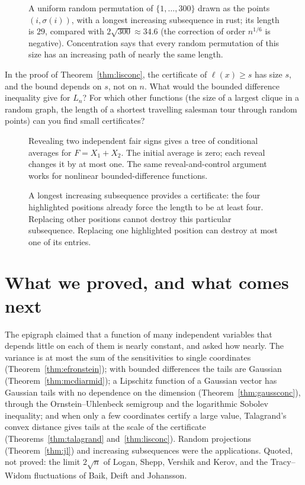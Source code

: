 \begin{figure}[ht]
\centering{}
\caption{A uniform random permutation of $\{1,\dots,300\}$ drawn as the points $(i,\sigma(i))$, with a longest increasing subsequence in rust; its length is $29$,
compared with $2\sqrt{300}\approx34.6$ (the correction of order $n^{1/6}$ is negative). Concentration says that every random permutation of this size has an
increasing path of nearly the same length.}
\label{fig:lis}
\end{figure}

\begin{think}
In the proof of Theorem~\ref{thm:lisconc}, the certificate of $\ell(x)\ge s$ has size $s$, and the bound depends on $s$, not on $n$. What would the bounded difference inequality
give for $L_n$? For which other functions (the size of a largest clique in a random graph, the length of a shortest travelling salesman tour through random points) can
you find small certificates?
\end{think}

\begin{figure}[ht]
\centering{}
\caption{Revealing two independent fair signs gives a tree of conditional averages for $F=X_1+X_2$. The initial average is zero; each reveal changes it by at most one. The same reveal-and-control argument works for nonlinear bounded-difference functions.}
\label{fig:v11-ch08-reveal-tree}
\end{figure}

\begin{figure}[ht]
\centering{}
\caption{A longest increasing subsequence provides a certificate: the four highlighted positions already force the length to be at least four. Replacing other positions cannot destroy this particular subsequence. Replacing one highlighted position can destroy at most one of its entries.}
\label{fig:v11-ch08-certificate}
\end{figure}

\section{What we proved, and what comes next}

The epigraph claimed that a function of many independent variables that depends little on each of them is nearly constant, and asked how nearly.
The variance is at most the sum of the sensitivities to single coordinates (Theorem~\ref{thm:efronstein}); with bounded differences the tails are
Gaussian (Theorem~\ref{thm:mcdiarmid}); a Lipschitz function of a Gaussian vector has Gaussian tails with no dependence on the dimension
(Theorem~\ref{thm:gaussconc}), through the Ornstein--Uhlenbeck semigroup and the logarithmic Sobolev inequality; and when only a few coordinates
certify a large value, Talagrand's convex distance gives tails at the scale of the certificate (Theorems~\ref{thm:talagrand} and~\ref{thm:lisconc}).
Random projections (Theorem~\ref{thm:jl}) and increasing subsequences were the applications. Quoted, not proved: the limit $2\sqrt n$ of Logan, Shepp,
Vershik and Kerov, and the Tracy--Widom fluctuations of Baik, Deift and Johansson.


